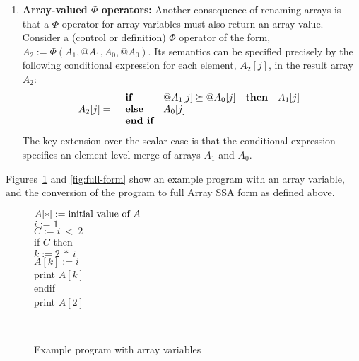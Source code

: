 \begin{enumerate}
\item {\bf Array-valued  $\Phi$ operators:}
\label{array:phi}
Another consequence of renaming arrays is that
a $\Phi$ operator
for array variables must also return an
array value.  Consider a (control or definition) $\Phi$ operator of
the form, $A_2 := \Phi(A_1, @A_1, A_0, @A_0)$. Its semantics can be specified precisely
by the following conditional expression
for each element, $A_2[j]$, in the result array $A_2$:
\begin{eqnarray}
A_2[j] & = &
  \begin{array}{llll}
\mbox{\bf if} & @A_1[j] \succeq @A_0[j] & \textbf{then} & A_1[j] \\
\mbox{\bf else} & A_0[j] \\
\mbox{\bf end if} \label{eqn:cond-expr}
  \end{array}
\end{eqnarray}
The key extension over the scalar case is that the conditional expression
specifies an element-level merge of arrays $A_1$ and $A_0$.
\end{enumerate}





Figures~\ref{fig:ssa-acyclic-array} and \ref{fig:full-form}
show an example program with an
array variable, and the conversion of the program to full Array SSA form as
defined above.

\begin{figure}%
\begin{center}
\parbox{3.0in}{
\begin{programa}
\Tb $A[*] := \mbox{\rm initial value of $A$}$\\
\Tb$i := 1$ \\
\Tb $C := i\ <\ 2 $\\
\Tb if $C$ then \\
\Tc $k := 2\ *\ i$ \\
\Tc $A[k] := i$\\
\Tc print $A[k]$\\
\Tb endif \\
\Tb print $A[2]$
\end{programa}
}\\
\end{center}
\caption{Example program with array variables}
\label{fig:ssa-acyclic-array}
\end{figure}


